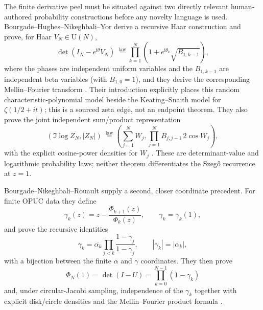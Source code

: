 \begin{sloppypar}
The finite derivative peel must be situated against two directly relevant human-authored
probability constructions before any novelty language is used.  Bourgade--Hughes--Nikeghbali--Yor
derive a recursive Haar construction and prove, for Haar $V_N\in\mathrm U(N)$,
\begin{equation}
 \det(I_N-e^{\mathrm i\theta}V_N)\ \stackrel{\mathrm{law}}{=}
 \prod_{k=1}^{N}\left(1+e^{\mathrm i\theta_k}\sqrt{B_{1,k-1}}\right),
 \label{eq:bhn-york-independent-product}
\end{equation}
where the phases are independent uniform variables and the $B_{1,k-1}$ are independent beta
variables (with $B_{1,0}=1$), and they derive the corresponding Mellin--Fourier transform
\cite[Prop.~2.1, Prop.~2.2, eqs.~(1.1), (2.6)]{bourgadeHughesNikeghbaliYor2007}.
Their introduction explicitly places this random characteristic-polynomial model beside the
Keating--Snaith model for $\zeta(1/2+it)$; this is a sourced zeta edge, not an endpoint theorem.
They also prove the joint independent sum/product representation
\begin{equation}
 (\Im\log Z_N,|Z_N|)\ \stackrel{\mathrm{law}}{=}
 \left(\sum_{j=1}^{N}W_j,\prod_{j=1}^{N}B_{j,j-1}\,2\cos W_j\right),
 \label{eq:bhn-york-joint-product}
\end{equation}
with the explicit cosine-power densities for $W_j$
\cite[Thm.~3.1, eqs.~(3.7)--(3.8)]{bourgadeHughesNikeghbaliYor2007}.  These are
determinant-value and logarithmic probability laws; neither theorem differentiates the
Szeg\H{o} recurrence at $z=1$.

Bourgade--Nikeghbali--Rouault supply a second, closer coordinate precedent.  For finite OPUC
data they define
\begin{equation}
 \gamma_k(z)=z-\frac{\Phi_{k+1}(z)}{\Phi_k(z)},\qquad
 \gamma_k=\gamma_k(1),
 \label{eq:bnr-gamma-definition}
\end{equation}
and prove the recursive identities
\begin{equation}
 \gamma_k=\overline{\alpha_k}
 \prod_{j<k}\frac{1-\overline{\gamma_j}}{1-\gamma_j},
 \qquad |\gamma_k|=|\alpha_k|,
 \label{eq:bnr-gamma-alpha-map}
\end{equation}
with a bijection between the finite $\alpha$ and $\gamma$ coordinates.  They then prove
\begin{equation}
 \Phi_N(1)=\det(I-U)=\prod_{k=0}^{N-1}(1-\gamma_k)
 \label{eq:bnr-determinant-product}
\end{equation}
and, under circular-Jacobi sampling, independence of the $\gamma_k$ together with explicit
disk/circle densities and the Mellin--Fourier product formula
\cite[Defs.~(3.1)--(3.3), Prop.~3.2, Thm.~3.1, Prop.~4.1]{bourgadeNikeghbaliRouault2008}.


\end{sloppypar}
